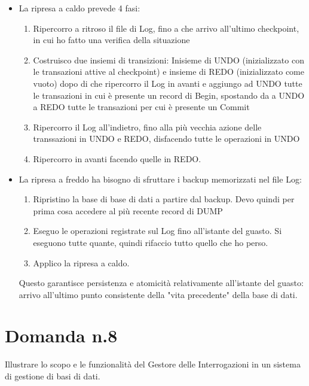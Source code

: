 \documentclass{article}
\begin{document}
\begin{itemize}
    \item La ripresa a caldo prevede 4 fasi: 
        \begin{enumerate}
            \item Ripercorro a ritroso il file di Log, fino a che arrivo all'ultimo checkpoint, in cui ho fatto una verifica della situazione
            \item Costruisco due insiemi di transizioni: Inisieme di UNDO (inizializzato con le transazioni attive al checkpoint) e insieme di REDO (inizializzato come vuoto) dopo di che ripercorro il Log in avanti e aggiungo ad UNDO tutte le transazioni in cui è presente un record di Begin, spostando da a UNDO a REDO tutte le transazioni per cui è presente un Commit
            \item Ripercorro il Log all'indietro, fino alla più vecchia azione delle transsazioni in UNDO e REDO, disfacendo tutte le operazioni in UNDO
            \item Ripercorro in avanti facendo quelle in REDO.
        \end{enumerate}
    \item La ripresa a freddo ha bisogno di sfruttare i backup memorizzati nel file Log:
        \begin{enumerate}
            \item Ripristino la base di base di dati a partire dal backup. Devo quindi per prima cosa accedere al più recente record di DUMP 
            \item Eseguo le operazioni registrate sul Log fino all'istante del guasto. Si eseguono tutte quante, quindi rifaccio tutto quello che ho perso.
            \item Applico la ripresa a caldo.
        \end{enumerate}
        Questo garantisce persistenza e atomicità relativamente all'istante del guasto: arrivo all'ultimo punto consistente della "vita precedente" della base di dati.
\end{itemize}

\section*{Domanda n.8}
Illustrare lo scopo e le funzionalità del Gestore delle Interrogazioni in un sistema di gestione di basi di dati.
\end{document}
